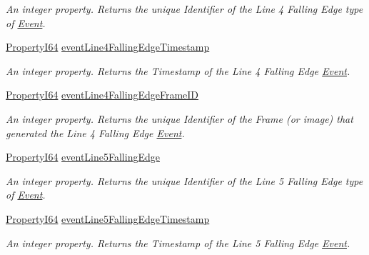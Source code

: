 \begin{DoxyCompactItemize}
\begin{DoxyCompactList}\small\item\em An integer property. Returns the unique Identifier of the Line 4 Falling Edge type of \hyperlink{classmv_i_m_p_a_c_t_1_1acquire_1_1_event}{Event}. \end{DoxyCompactList}\item 
\hyperlink{group___common_interface_ga81749b2696755513663492664a18a893}{Property\+I64} \hyperlink{classmv_i_m_p_a_c_t_1_1acquire_1_1_gen_i_cam_1_1_event_control_a7f2d3b3bfc818335326cf57559487809}{event\+Line4\+Falling\+Edge\+Timestamp}
\begin{DoxyCompactList}\small\item\em An integer property. Returns the Timestamp of the Line 4 Falling Edge \hyperlink{classmv_i_m_p_a_c_t_1_1acquire_1_1_event}{Event}. \end{DoxyCompactList}\item 
\hyperlink{group___common_interface_ga81749b2696755513663492664a18a893}{Property\+I64} \hyperlink{classmv_i_m_p_a_c_t_1_1acquire_1_1_gen_i_cam_1_1_event_control_a15a04c66a279665702a5f7ee5eab1d48}{event\+Line4\+Falling\+Edge\+Frame\+I\+D}
\begin{DoxyCompactList}\small\item\em An integer property. Returns the unique Identifier of the Frame (or image) that generated the Line 4 Falling Edge \hyperlink{classmv_i_m_p_a_c_t_1_1acquire_1_1_event}{Event}. \end{DoxyCompactList}\item 
\hyperlink{group___common_interface_ga81749b2696755513663492664a18a893}{Property\+I64} \hyperlink{classmv_i_m_p_a_c_t_1_1acquire_1_1_gen_i_cam_1_1_event_control_adb9c1e0d3edf268a718ebffe35b87fd5}{event\+Line5\+Falling\+Edge}
\begin{DoxyCompactList}\small\item\em An integer property. Returns the unique Identifier of the Line 5 Falling Edge type of \hyperlink{classmv_i_m_p_a_c_t_1_1acquire_1_1_event}{Event}. \end{DoxyCompactList}\item 
\hyperlink{group___common_interface_ga81749b2696755513663492664a18a893}{Property\+I64} \hyperlink{classmv_i_m_p_a_c_t_1_1acquire_1_1_gen_i_cam_1_1_event_control_aea63a64784f99f09005896e54933dcf8}{event\+Line5\+Falling\+Edge\+Timestamp}
\begin{DoxyCompactList}\small\item\em An integer property. Returns the Timestamp of the Line 5 Falling Edge \hyperlink{classmv_i_m_p_a_c_t_1_1acquire_1_1_event}{Event}. \end{DoxyCompactList}\item 

\end{DoxyCompactItemize}

